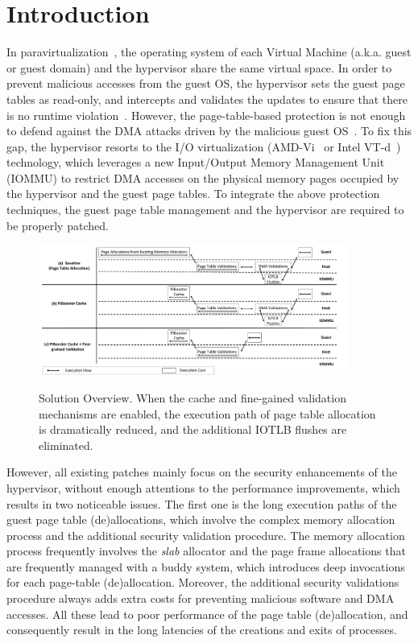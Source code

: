 \section{Introduction} \label{sec:intro}
In paravirtualization~\cite{XEN-SOSP03,whitaker2002scale}, the operating system of each Virtual Machine (a.k.a. guest or guest domain) and the hypervisor share the same virtual space.
In order to prevent malicious accesses from the guest OS, the hypervisor sets the guest page tables as read-only, and intercepts and validates the updates to ensure that there is no runtime violation~\cite{XEN-SOSP03}.
However, the page-table-based protection is not enough to defend against the DMA attacks driven by the malicious guest OS~\cite{disaggregation}.
To fix this gap, the hypervisor resorts to the I/O virtualization (AMD-Vi~\cite{amdvt} or Intel VT-d~\cite{intelvt}) technology, which leverages a new Input/Output Memory Management Unit (IOMMU) to restrict DMA accesses on the physical memory pages occupied by the hypervisor and the guest page tables.
To integrate the above protection techniques, the guest page table management and the hypervisor are required to be properly patched.

\begin{figure}[ht]
\centering
\includegraphics[width=0.9\textwidth]{image/overview/overview.pdf} \\
\caption{Solution Overview. When the \name cache and fine-gained validation mechanisms are enabled,
the execution path of page table allocation is dramatically reduced, and the additional IOTLB flushes are eliminated.}
\label{fig:overview}
\end{figure}

However, all existing patches mainly focus on the security enhancements of the hypervisor, without enough attentions to the performance improvements, which results in two noticeable issues.
The first one is the long execution paths of the guest page table (de)allocations, which involve the complex memory allocation process and the additional security validation procedure.
The memory allocation process frequently involves the \emph{slab} allocator and the page frame allocations that are frequently managed with a buddy system, which introduces deep invocations for each page-table (de)allocation.
Moreover, the additional security validations procedure always adds extra costs for preventing malicious software and DMA accesses.
All these lead to poor performance of the page table (de)allocation, and consequently result in the long latencies of the creations and exits of processes.

